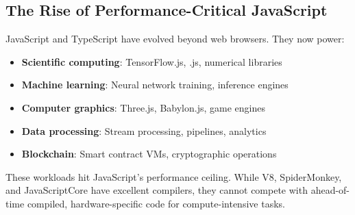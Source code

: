 \subsection{The Rise of Performance-Critical JavaScript}

JavaScript and TypeScript have evolved beyond web browsers. They now power:

\begin{itemize}[noitemsep]
  \item \textbf{Scientific computing}: TensorFlow.js, .js, numerical libraries
  \item \textbf{Machine learning}: Neural network training, inference engines
  \item \textbf{Computer graphics}: Three.js, Babylon.js, game engines
  \item \textbf{Data processing}: Stream processing,  pipelines, analytics
  \item \textbf{Blockchain}: Smart contract VMs, cryptographic operations
\end{itemize}

These workloads hit JavaScript's performance ceiling. While V8, SpiderMonkey, and JavaScriptCore have excellent  compilers, they cannot compete with ahead-of-time compiled, hardware-specific code for compute-intensive tasks.
